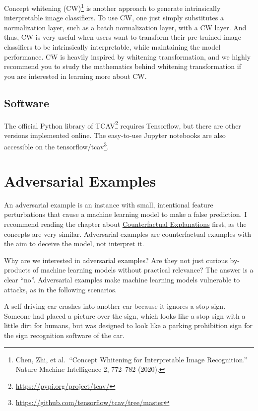 \documentclass[
  12pt,
]{krantz}
\renewcommand{\href}[2]{#2\footnote{\url{#1}}}
\begin{document}
Concept whitening (CW)\footnote{Chen, Zhi, et al.~``Concept Whitening for Interpretable Image Recognition.'' Nature Machine Intelligence 2, 772--782 (2020).} is another approach to generate intrinsically interpretable image classifiers.
To use CW, one just simply substitutes a normalization layer, such as a batch normalization layer, with a CW layer.
And thus, CW is very useful when users want to transform their pre-trained image classifiers to be intrinsically interpretable, while maintaining the model performance.
CW is heavily inspired by whitening transformation, and we highly recommend you to study the mathematics behind whitening transformation if you are interested in learning more about CW.

\hypertarget{software-6}{%
\subsection{Software}\label{software-6}}

The official Python library of \href{https://pypi.org/project/tcav/}{TCAV} requires Tensorflow, but there are other versions implemented online.
The easy-to-use Jupyter notebooks are also accessible on the \href{https://github.com/tensorflow/tcav/tree/master}{tensorflow/tcav}.

\newpage

\hypertarget{adversarial}{%
\section{Adversarial Examples}\label{adversarial}}

An adversarial example is an instance with small, intentional feature perturbations that cause a machine learning model to make a false prediction.
I recommend reading the chapter about \protect\hyperlink{counterfactual}{Counterfactual Explanations} first, as the concepts are very similar.
Adversarial examples are counterfactual examples with the aim to deceive the model, not interpret it.

Why are we interested in adversarial examples?
Are they not just curious by-products of machine learning models without practical relevance?
The answer is a clear ``no''.
Adversarial examples make machine learning models vulnerable to attacks, as in the following scenarios.

A self-driving car crashes into another car because it ignores a stop sign.
Someone had placed a picture over the sign, which looks like a stop sign with a little dirt for humans, but was designed to look like a parking prohibition sign for the sign recognition software of the car.
\end{document}
